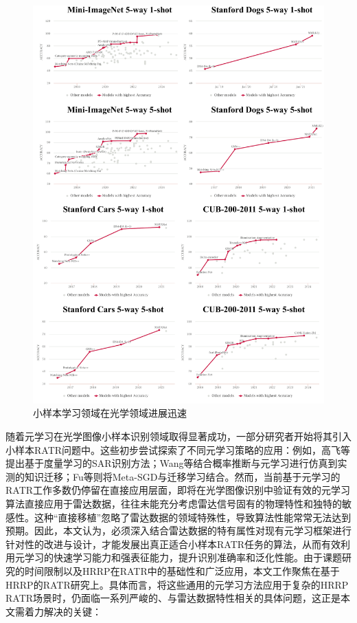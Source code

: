 \begin{figure}[h!]
    \centering
    \includegraphics[width=0.8\linewidth]{figures/fsl.pdf}
    \caption{小样本学习领域在光学领域进展迅速}
    \label{fig:fsl_task}
\end{figure}

随着元学习在光学图像小样本识别领域取得显著成功，一部分研究者开始将其引入小样本RATR问题中。这些初步尝试探索了不同元学习策略的应用：例如，高飞等提出基于度量学习的SAR识别方法；Wang等结合概率推断与元学习进行仿真到实测的知识迁移；Fu等则将Meta-SGD与迁移学习结合。然而，当前基于元学习的RATR工作多数仍停留在直接应用层面，即将在光学图像识别中验证有效的元学习算法直接应用于雷达数据，往往未能充分考虑雷达信号固有的物理特性和独特的敏感性。这种“直接移植”忽略了雷达数据的领域特殊性，导致算法性能常常无法达到预期。因此，本文认为，必须深入结合雷达数据的特有属性对现有元学习框架进行针对性的改进与设计，才能发展出真正适合小样本RATR任务的算法，从而有效利用元学习的快速学习能力和强表征能力，提升识别准确率和泛化性能。由于课题研究的时间限制以及HRRP在RATR中的基础性和广泛应用，本文工作聚焦在基于HRRP的RATR研究上。具体而言，将这些通用的元学习方法应用于复杂的HRRP RATR场景时，仍面临一系列严峻的、与雷达数据特性相关的具体问题，这正是本文需着力解决的关键：

